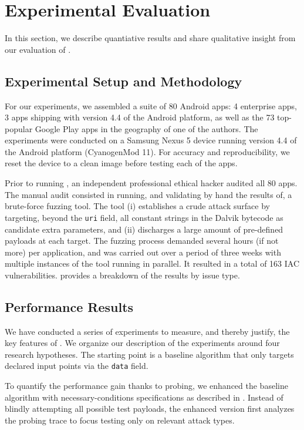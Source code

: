 \section{Experimental Evaluation}\label{Se:evaluation}

In this section, we describe quantiative results and share qualitative insight from our evaluation of \Tool. 

\subsection{Experimental Setup and Methodology}

For our experiments, we assembled a suite of 80 Android apps: 4 enterprise apps, 3 apps shipping with version 4.4 of the Android platform, as well as the 73 top-popular Google Play apps in the geography of one of the authors.
The experiments were conducted on a Samsung Nexus 5 device running version 4.4 of the Android platform (CyanogenMod 11). For accuracy and reproducibility, we reset the device to a clean image before testing each of the apps.

Prior to running \Tool, an independent professional ethical hacker audited all 80 apps. The manual audit consisted in running, and validating by hand the results of, a brute-force fuzzing tool. The tool (i) establishes a crude attack surface by targeting, beyond the {\tt uri} field, all constant strings in the Dalvik bytecode as candidate extra parameters, and (ii) discharges a large amount of pre-defined payloads at each target.
The fuzzing process demanded several hours (if not more) per application, and was carried out over a period of three weeks with multiple instances of the tool running in parallel. It resulted in a total of 163 IAC vulnerabilities.  provides a breakdown of the results by issue type.

\subsection{Performance Results}

We have conducted a series of experiments to measure, and thereby justify, the key features of \Tool. We organize our description of the experiments around four research hypotheses. The starting point is a baseline algorithm that only targets declared input points via the {\tt data} field.

 To quantify the performance gain thanks to probing, we enhanced the baseline algorithm with necessary-conditions specifications as described in . Instead of blindly attempting all possible test payloads, the enhanced version first analyzes the probing trace to focus testing only on relevant attack types.

